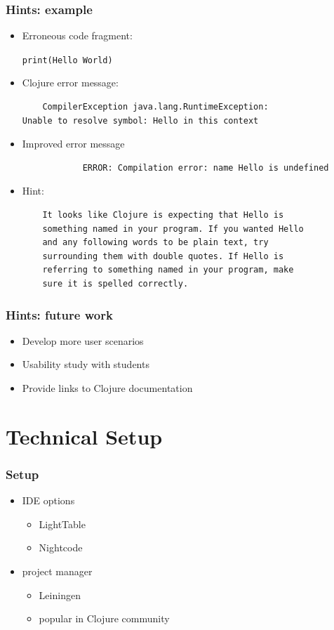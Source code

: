 \documentclass{beamer}
\begin{document}
\begin{frame}[fragile]
\frametitle{Hints: example}

	\begin{itemize}
		\item Erroneous code fragment:
		
			\texttt{print(Hello World)}

		\item Clojure error message:
		
  			 \begin{verbatim}
	CompilerException java.lang.RuntimeException:
Unable to resolve symbol: Hello in this context
			\end{verbatim}
			
		\item Improved error message
		
			\begin{verbatim}
			ERROR: Compilation error: name Hello is undefined
			\end{verbatim}
			
		\item Hint:
		
			\begin{verbatim}
	It looks like Clojure is expecting that Hello is
	something named in your program. If you wanted Hello
	and any following words to be plain text, try
	surrounding them with double quotes. If Hello is
	referring to something named in your program, make
	sure it is spelled correctly.
			\end{verbatim}
	
	\end{itemize}
\end{frame}

\begin{frame}
\frametitle{Hints: future work}
	\begin{itemize}
  	 \item Develop more user scenarios
  	 \item Usability study with students
  	 \item Provide links to Clojure documentation
	 \end{itemize}
\end{frame}
\section{Technical Setup}
\begin{frame}
\frametitle{Setup}
	\begin{itemize}
		\item IDE options
		\begin{itemize}
			\item LightTable
			\item Nightcode
		\end{itemize}
		\item project manager
		\begin{itemize}
			\item Leiningen
			\item popular in Clojure community
		\end{itemize}
	\end{itemize}
\end{frame}
\end{document}
